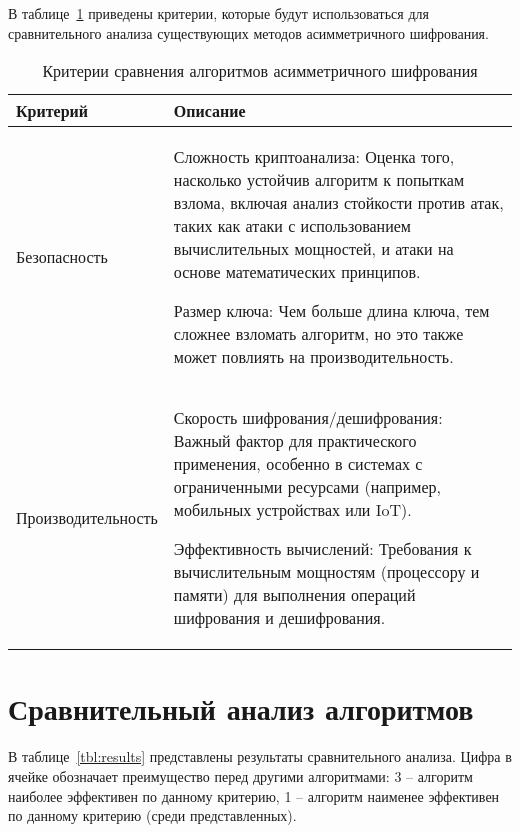 В таблице~\ref{tbl:criterions} приведены критерии, которые будут использоваться для сравнительного анализа существующих методов асимметричного шифрования.

\begin{table}[H]
	\begin{center}
		\begin{threeparttable}
			\captionsetup{justification=raggedright,singlelinecheck=off}
			\caption{\label{tbl:criterions} Критерии сравнения алгоритмов асимметричного шифрования}
			\begin{tabular}{|p{4cm}|p{10cm}|}
				\hline
				Критерий & Описание \\ \hline
				Безопасность & Сложность криптоанализа: Оценка того, насколько устойчив алгоритм к попыткам взлома, включая анализ стойкости против атак, таких как атаки с использованием вычислительных мощностей, и атаки на основе математических принципов.
				
				Размер ключа: Чем больше длина ключа, тем сложнее взломать алгоритм, но это также может повлиять на производительность. \\ \hline
				Производительность & Скорость шифрования/дешифрования: Важный фактор для практического применения, особенно в системах с ограниченными ресурсами (например, мобильных устройствах или IoT).
				
				Эффективность вычислений: Требования к вычислительным мощностям (процессору и памяти) для выполнения операций шифрования и дешифрования. \\ \hline
				
			\end{tabular}
		\end{threeparttable}
	\end{center}
\end{table}
	
\section{Сравнительный анализ алгоритмов}

В таблице~\ref{tbl:results} представлены результаты сравнительного анализа. Цифра в ячейке обозначает преимущество перед другими алгоритмами: 3 -- алгоритм наиболее эффективен по данному критерию, 1 -- алгоритм наименее эффективен по данному критерию (среди представленных).

